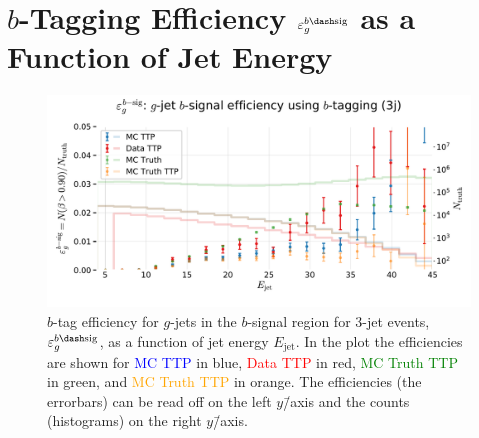 \section[b-tag Efficiency for g-Jets in the b-Signal Region for 3-jet events]{$b$-Tagging Efficiency $\varepsilon_g^{b\dash\mathrm{sig}}$ as a Function of Jet Energy}
\begin{figure}
  \centerfloat
  \includegraphics[width=1.1\textwidth, trim=20 30 0 40, clip]{figures/quarks/eff_g_bsig-down_sample=1.00-ML_vars=vertex-selection=b-ejet_min=4-n_iter_RS_lgb=99-n_iter_RS_xgb=9-cdot_cut=0.90-version=19.pdf}
  \caption[$b$-Tagging Efficiency $\varepsilon_g^{b\dash\mathrm{sig}}$ as a Function of Jet Energy]
          {$b$-tag efficiency for $g$-jets in the $b$-signal region for 3-jet events, $\varepsilon_g^{b\dash\mathrm{sig}}$, as a function of jet energy $E_\mathrm{jet}$. In the plot the efficiencies are shown for \textcolor{blue}{MC TTP} in blue, \textcolor{red}{Data TTP} in red, \textcolor{green}{MC Truth TTP} in green, and \textcolor{orange}{MC Truth TTP} in orange. The efficiencies (the errorbars) can be read off on the left $y$\=/axis and the counts (histograms) on the right $y$\=/axis.} 
  \label{fig:q:effiency_btag_gjet_bsig}
\end{figure}
\clearpage



\FloatBarrier
